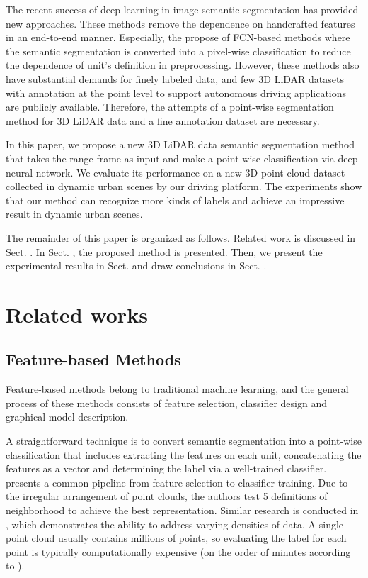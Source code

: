 	The recent success of deep learning in image semantic segmentation has provided new approaches\cite{garcia2017review}. These methods remove the dependence on handcrafted features in an end-to-end manner. Especially, the propose of FCN-based methods\cite{long2015fully} where the semantic segmentation is converted into a pixel-wise classification to reduce the dependence of unit's definition in preprocessing. However, these methods also have substantial demands for finely labeled data\cite{garcia2017review}, and few 3D LiDAR datasets with annotation at the point level to support autonomous driving applications are publicly available. Therefore, the attempts of a point-wise segmentation method for 3D LiDAR data and a fine annotation dataset are necessary.
	
	In this paper, we propose a new 3D LiDAR data semantic segmentation method that takes the range frame as input and make a point-wise classification via deep neural network. We evaluate its performance on a new 3D point cloud dataset collected in dynamic urban scenes by our driving platform. The experiments show that our method can recognize more kinds of labels and achieve an impressive result in dynamic urban scenes.
	
	The remainder of this paper is organized as follows. Related work is discussed in Sect. \uppercase\expandafter{}. In Sect. \uppercase\expandafter{}, the proposed method is presented. Then, we present the experimental results in Sect. \uppercase\expandafter{} and draw conclusions in Sect. \uppercase\expandafter{}.
	
	
	\section{Related works}
	\subsection{Feature-based Methods}
	Feature-based methods belong to traditional machine learning, and the general process of these methods consists of feature selection, classifier design and graphical model description.
	
	A straightforward technique is to convert semantic segmentation into a point-wise classification that includes extracting the features on each unit, concatenating the features as a vector and determining the label via a well-trained classifier. \cite{weinmann2014semantic} presents a common pipeline from feature selection to classifier training. Due to the irregular arrangement of point clouds, the authors test 5 definitions of neighborhood to achieve the best representation. Similar research is conducted in \cite{hackel2016fast}, which demonstrates the ability to address varying densities of data. A single point cloud usually contains millions of points, so evaluating the label for each point is typically computationally expensive (on the order of minutes according to \cite{hackel2016fast}). 
	
